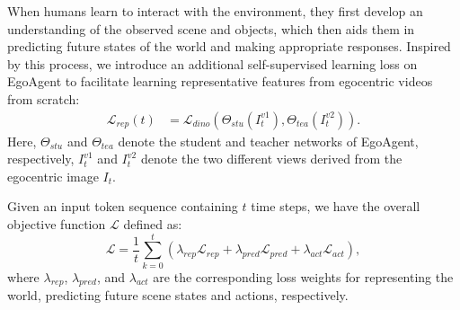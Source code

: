 {\vspace{1.5mm}
When humans learn to interact with the environment, they first develop an understanding of the observed scene and objects, which then aids them in predicting future states of the world and making appropriate responses. Inspired by this process, we introduce an additional self-supervised learning loss on EgoAgent to facilitate learning representative features from egocentric videos from scratch:
\begin{align}
    \mathcal{L}_{rep}(t)&=\mathcal{L}_{dino}(\Theta_{stu}(I_t^{v1})
    , \Theta_{tea}(I_t^{v2})).  
\end{align}
Here, $\Theta_{stu}$ and $\Theta_{tea}$ denote the student and teacher networks of EgoAgent, respectively, $I_t^{v1}$ and $I_t^{v2}$ denote the two different views derived from the egocentric image $I_t$. 


\vspace{1.5mm}
Given an input token sequence containing $t$ time steps, we have the overall objective function $\mathcal{L}$ defined as:
\begin{equation}
    \mathcal{L} = \frac{1}{t}\sum_{k=0}^t{(
    \lambda_{rep}\mathcal{L}_{rep} + \lambda_{pred}\mathcal{L}_{pred} +
    \lambda_{act}\mathcal{L}_{act}),
    }
\end{equation}
where $\lambda_{rep}$, $\lambda_{pred}$, and $\lambda_{act}$ are the corresponding loss weights for representing the world, predicting future scene states and actions, respectively.

}
